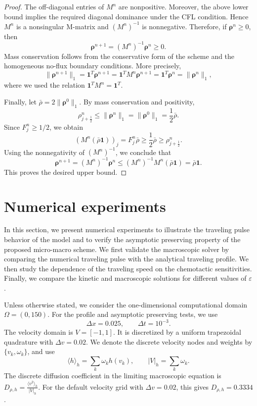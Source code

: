 \documentclass[11pt,twoside]{article}
\numberwithin{equation}{section}
\theoremstyle{plain}
\theoremstyle{nonumberplain}
\newtheorem{proof}{Proof.-}
\newcommand{\brho}{\boldsymbol{\rho}}
\begin{document}
{\begin{proof}
{The off-diagonal entries of $M^n$ are nonpositive. Moreover, the above
lower bound implies the required diagonal dominance under the CFL
condition. Hence $M^n$ is a nonsingular M-matrix and $(M^n)^{-1}$ is
nonnegative. Therefore, if $\brho^n\ge0$, then
\[
\brho^{n+1}=(M^n)^{-1}\brho^n\ge0.
\]
Mass conservation follows from the conservative form of the scheme and the
homogeneous no-flux boundary conditions.  More precisely, 
\[
\|\brho^{n+1}\|_1
=
\mathbf 1^T\brho^{n+1}
=
\mathbf 1^T M^n\brho^{n+1}
=
\mathbf 1^T\brho^n
=
\|\brho^n\|_1 ,
\]
where we used the relation
\(
\mathbf 1^T M^n=\mathbf 1^T .
\)

Finally, let $\bar\rho=2\|\brho^0\|_1$. By mass conservation and
positivity,
\[
\rho_{j+\frac12}^n\le \|\brho^n\|_1=\|\brho^0\|_1=\frac12\bar\rho .
\]
Since $F_j^n\ge1/2$, we obtain
\[
(M^n(\bar\rho\mathbf 1))_j
=
F_j^n\bar\rho
\ge
\frac12\bar\rho
\ge
\rho_{j+\frac12}^n .
\]
Using the nonnegativity of $(M^n)^{-1}$, we conclude that
\[
\brho^{n+1}
=
(M^n)^{-1}\brho^n
\le
(M^n)^{-1}M^n(\bar\rho\mathbf 1)
=
\bar\rho\mathbf 1 .
\]
This proves the desired upper bound. }
\end{proof}



\section{Numerical experiments}\label{sec: numerics}

In this section, we present numerical experiments to illustrate the
traveling pulse behavior of the model and to verify the asymptotic
preserving property of the proposed micro-macro scheme. We first validate
the macroscopic solver by comparing the numerical traveling pulse with
the analytical traveling profile. We then study the dependence of the
traveling speed on the chemotactic sensitivities. Finally, we compare
the kinetic and macroscopic solutions for different values of
\(\varepsilon\).


Unless otherwise stated, we consider the one-dimensional computational
domain \(\Omega=(0,150)\). For the profile and asymptotic preserving
tests, we use
\begingroup\color{red}
\[
\Delta x=0.025,
\qquad
\Delta t=10^{-3}.
\]
\endgroup
The velocity domain is \(V=[-1,1]\). It is discretized by a uniform
trapezoidal quadrature with \(\Delta v=0.02\). We denote the discrete
velocity nodes and weights by \(\{v_k,\omega_k\}\), and use
\[
\langle h\rangle_h=\sum_k\omega_k h(v_k),
\qquad
|V|_h=\sum_k\omega_k .
\]
The discrete diffusion coefficient in the limiting macroscopic equation
is
 $D_{\rho,h}
=
\frac{\langle v^2\rangle_h}{|V|_h}.$
For the default velocity grid with \(\Delta v=0.02\), this gives
\(D_{\rho,h}=0.3334\).


}
\end{document}
